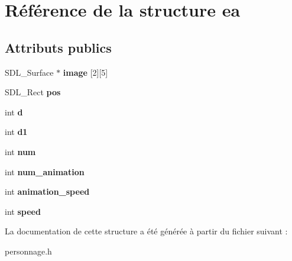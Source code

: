 \hypertarget{structea}{}\section{Référence de la structure ea}
\label{structea}
\subsection*{Attributs publics}
\begin{DoxyCompactItemize}
\item 
\mbox{\label{structea_a7ad1c0910e9838a81ae71878ca10a11b}} 
S\+D\+L\+\_\+\+Surface $\ast$ {\bfseries image} \mbox{[}2\mbox{]}\mbox{[}5\mbox{]}
\item 
\mbox{\label{structea_a49262ff57ab0f98ad2de7217a5eeaa48}} 
S\+D\+L\+\_\+\+Rect {\bfseries pos}
\item 
\mbox{\label{structea_ab90dafb742e4bca460cc08ed35da1246}} 
int {\bfseries d}
\item 
\mbox{\label{structea_a036d0299c9cb669f7d7de4608dc94c58}} 
int {\bfseries d1}
\item 
\mbox{\label{structea_a47fd200529d0bb95bb09bfafe7f040a6}} 
int {\bfseries num}
\item 
\mbox{\label{structea_a3287146d5da3a8aacbe7d7e80825c4ff}} 
int {\bfseries num\+\_\+animation}
\item 
\mbox{\label{structea_afa5ce90b88e2c4f45be16dc54f58203d}} 
int {\bfseries animation\+\_\+speed}
\item 
\mbox{\label{structea_afc3791816f43b84937b2df300b75db8e}} 
int {\bfseries speed}
\end{DoxyCompactItemize}


La documentation de cette structure a été générée à partir du fichier suivant \+:\begin{DoxyCompactItemize}
\item 
personnage.\+h\end{DoxyCompactItemize}
